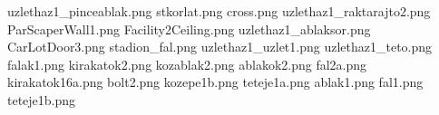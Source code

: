 uzlethaz1_pinceablak.png
stkorlat.png
cross.png
uzlethaz1_raktarajto2.png
ParScaperWall1.png
Facility2Ceiling.png
uzlethaz1_ablaksor.png
CarLotDoor3.png
stadion_fal.png
uzlethaz1_uzlet1.png
uzlethaz1_teto.png
falak1.png
kirakatok2.png
kozablak2.png
ablakok2.png
fal2a.png
kirakatok16a.png
bolt2.png
kozepe1b.png
teteje1a.png
ablak1.png
fal1.png
teteje1b.png
